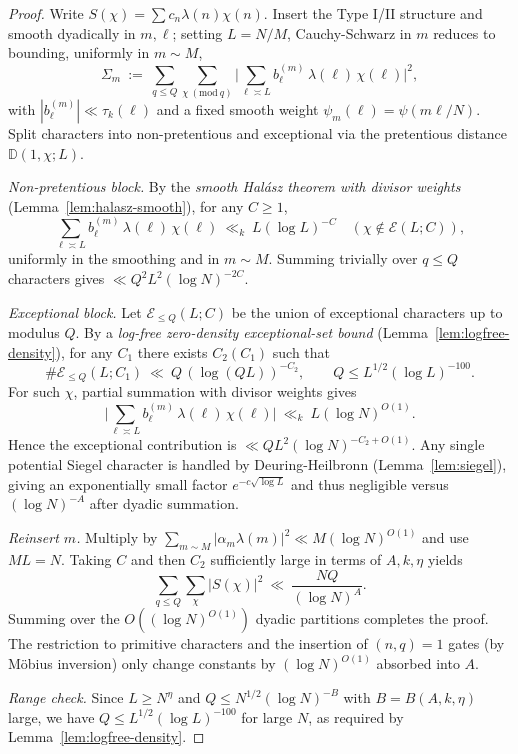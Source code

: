\documentclass[11pt]{article}
\theoremstyle{definition}
\theoremstyle{remark}
\begin{document}
\begin{proof}
	Write $S(\chi)=\sum c_n\lambda(n)\chi(n)$. Insert the Type I/II structure and smooth dyadically in $m,\ell$; setting $L=N/M$, Cauchy-Schwarz in $m$ reduces to bounding, uniformly in $m\sim M$,
	\[
		\Sigma_m\ :=\ \sum_{q\le Q}\sum_{\chi\ (\mathrm{mod}\ q)}\Big|\sum_{\ell\asymp L} b^{(m)}_\ell\,\lambda(\ell)\,\chi(\ell)\Big|^2,
	\]
	with $|b^{(m)}_\ell|\ll\tau_k(\ell)$ and a fixed smooth weight $\psi_m(\ell)=\psi(m\ell/N)$. Split characters into non-pretentious and exceptional via the pretentious distance $\mathbb D(1,\chi;L)$.

	\emph{Non-pretentious block.} By the \emph{smooth Hal\'asz theorem with divisor weights} (Lemma~\ref{lem:halasz-smooth}), for any $C\ge 1$,
	\[
		\sum_{\ell\asymp L} b^{(m)}_\ell\,\lambda(\ell)\,\chi(\ell)\ \ll_{k}\ L(\log L)^{-C}
		\quad(\chi\notin\mathcal E(L;C)),
	\]
	uniformly in the smoothing and in $m\sim M$. Summing trivially over $q\le Q$ characters gives $\ll Q^2 L^2(\log N)^{-2C}$.

	\emph{Exceptional block.} Let $\mathcal E_{\le Q}(L;C)$ be the union of exceptional characters up to modulus $Q$. By a \emph{log-free zero-density exceptional-set bound} (Lemma~\ref{lem:logfree-density}), for any $C_1$ there exists $C_2(C_1)$ such that
	\[
		\#\mathcal E_{\le Q}(L;C_1)\ \ll\ Q\,(\log (QL))^{-C_2},\qquad Q\le L^{1/2}(\log L)^{-100}.
	\]
	For such $\chi$, partial summation with divisor weights gives
	\[
		\Big|\sum_{\ell\asymp L} b^{(m)}_\ell\,\lambda(\ell)\,\chi(\ell)\Big|\ \ll_{k}\ L(\log N)^{O(1)}.
	\]
	Hence the exceptional contribution is $\ll Q L^2 (\log N)^{-C_2+O(1)}$. Any single potential Siegel character is handled by Deuring-Heilbronn (Lemma~\ref{lem:siegel}), giving an exponentially small factor $e^{-c\sqrt{\log L}}$ and thus negligible versus $(\log N)^{-A}$ after dyadic summation.

	\emph{Reinsert $m$.} Multiply by $\sum_{m\sim M}|\alpha_m\lambda(m)|^2\ll M(\log N)^{O(1)}$ and use $ML=N$. Taking $C$ and then $C_2$ sufficiently large in terms of $A,k,\eta$ yields
	\[
		\sum_{q\le Q}\sum_{\chi}|S(\chi)|^2\ \ll\ \frac{NQ}{(\log N)^A}.
	\]
	Summing over the $O((\log N)^{O(1)})$ dyadic partitions completes the proof. The restriction to primitive characters and the insertion of $(n,q)=1$ gates (by M\"obius inversion) only change constants by $(\log N)^{O(1)}$ absorbed into $A$.

	\emph{Range check.} Since $L\ge N^{\eta}$ and $Q\le N^{1/2}(\log N)^{-B}$ with $B=B(A,k,\eta)$ large, we have $Q\le L^{1/2}(\log L)^{-100}$ for large $N$, as required by Lemma~\ref{lem:logfree-density}.
\end{proof}
\end{document}
